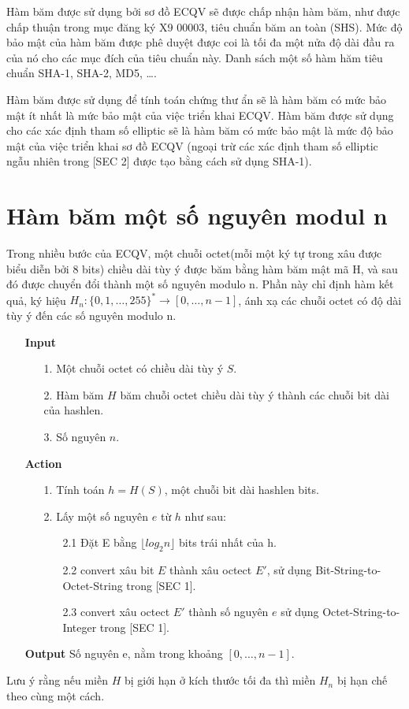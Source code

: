 \documentclass[a4paper,12pt]{report}
\begin{document}
Hàm băm được sử dụng bởi sơ đồ ECQV sẽ được chấp nhận hàm băm, như được chấp thuận trong mục đăng ký X9 00003, tiêu chuẩn băm an toàn (SHS). Mức độ bảo mật của hàm băm được phê duyệt được coi là tối đa một nửa độ dài đầu ra của nó cho các mục đích của tiêu chuẩn này. Danh sách một số hàm hăm tiêu chuẩn SHA-1, SHA-2, MD5, \ldots.

Hàm băm được sử dụng để tính toán chứng thư ẩn sẽ là hàm băm có mức bảo mật ít nhất là mức bảo mật của việc triển khai ECQV. Hàm băm được sử dụng cho các xác định tham số  elliptic sẽ là hàm băm có mức bảo mật là mức độ bảo mật của việc triển khai sơ đồ ECQV (ngoại trừ các xác định tham số elliptic ngẫu nhiên trong [SEC 2] được tạo bằng cách sử dụng SHA-1).
\section{Hàm băm một số nguyên modul n}
Trong nhiều bước của ECQV, một chuỗi octet(mỗi một ký tự trong xâu được biểu diễn bởi 8 bits) chiều dài tùy ý được băm bằng hàm băm mật mã H, và sau đó được chuyển đổi thành một số nguyên modulo n. Phần này chỉ định hàm kết quả, ký hiệu $H_n: \{0, 1,\ldots , 255\}^{*} \rightarrow [0,\ldots , n - 1]$, ánh xạ các chuỗi octet có độ dài tùy ý đến các số nguyên modulo n.
\begin{itemize}
\item[] \textbf{Input}
\begin{itemize}
\item[1. ] Một chuỗi octet có chiều dài tùy ý $S$.
\item[2. ] Hàm băm $H$ băm chuỗi octet chiều dài tùy ý thành các chuỗi bit dài của hashlen.
\item[3. ] Số nguyên $n$.
\end{itemize}
\item[] \textbf{Action}
\begin{itemize}
\item[1. ] Tính toán $h = H(S)$, một chuỗi bit dài hashlen bits.
\item[2. ] Lấy một số nguyên $e$ từ $h$ như sau:
\begin{itemize}
\item[2.1 ] Đặt E bằng $\lfloor log_2{n} \rfloor$ bits trái nhất của h.
\item[2.2 ] convert xâu bit $E$ thành xâu octect $E'$, sử dụng  Bit-String-to-Octet-String trong [SEC 1].
\item[2.3 ] convert xâu octect $E'$ thành số nguyên $e$ sử dụng Octet-String-to-Integer trong [SEC 1].
\end{itemize}
\end{itemize}
\item[] \textbf{Output} Số nguyên e, nằm trong khoảng $[0,\ldots , n - 1]$.
\end{itemize}
Lưu ý rằng nếu miền $H$ bị giới hạn ở kích thước tối đa thì miền $H_n$ bị hạn chế theo cùng một cách.
\end{document}
